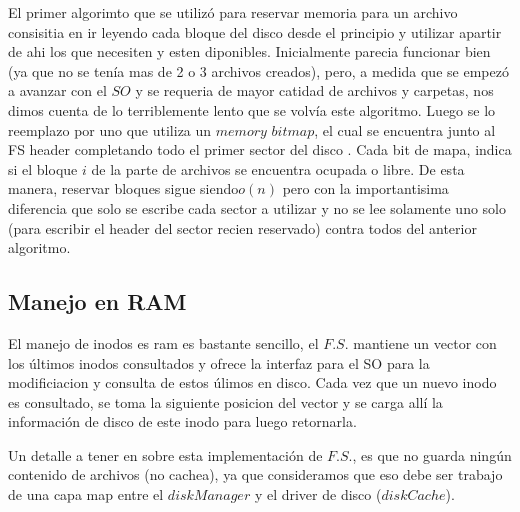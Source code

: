 \documentclass[english]{article}
\begin{document}
El primer algorimto que se utilizó para reservar memoria para un archivo
consisitia en ir leyendo cada bloque del disco desde el principio
y utilizar apartir de ahi los que necesiten y esten diponibles. Inicialmente
parecia funcionar bien (ya que no se tenía mas de 2 o 3 archivos creados),
pero, a medida que se empezó a avanzar con el $SO$ y se requeria
de mayor catidad de archivos y carpetas, nos dimos cuenta de lo terriblemente
lento que se volvía este algoritmo. Luego se lo reemplazo por uno
que utiliza un $memory$ $bitmap$, el cual se encuentra junto al
FS header completando todo el primer sector del disco . Cada bit de
mapa, indica si el bloque $i$ de la parte de archivos se encuentra
ocupada o libre. De esta manera, reservar bloques sigue siendo$o(n)$
pero con la importantisima diferencia que solo se escribe cada sector
a utilizar y no se lee solamente uno solo (para escribir el header
del sector recien reservado) contra todos del anterior algoritmo.


\subsection{Manejo en RAM}

El manejo de inodos es ram es bastante sencillo, el $F.S.$ mantiene
un vector con los últimos inodos consultados y ofrece la interfaz
para el SO para la modificiacion y consulta de estos úlimos en disco.
Cada vez que un nuevo inodo es consultado, se toma la siguiente posicion
del vector y se carga allí la información de disco de este inodo para
luego retornarla.

Un detalle a tener en sobre esta implementación de $F.S.$, es que
no guarda ningún contenido de archivos (no cachea), ya que consideramos
que eso debe ser trabajo de una capa map entre el $diskManager$ y
el driver de disco ($diskCache$).

\pagebreak{}
\end{document}
